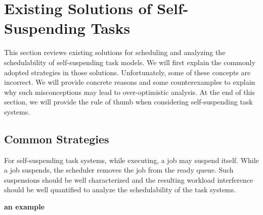 \section{Existing Solutions of Self-Suspending Tasks}

This section reviews existing solutions for scheduling and analyzing the schedulability of self-suspending task models. We will first explain the commonly adopted strategies in those solutions. Unfortunately, some of these concepts are incorrect. We will provide concrete reasons and some counterexamples to explain why such misconceptions may lead to over-optimistic analysis. At the end of this section, we will provide the rule of thumb when considering self-suspending task systems. 


\subsection{Common Strategies}

For self-suspending task systems, while executing, a job may suspend itself. While a job suspends, the scheduler removes the job from the ready queue. Such suspensions should be well characterized and the resulting workload interference should be well quantified to analyze the schedulability of the task systems. 

{\bf an example}

